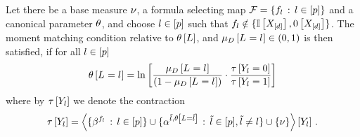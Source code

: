 \begin{lemma}
    \label{ref:lemMMinMLN}
    Let there be a base measure $\nu$, a formula selecting map $\mathcal{F}=\{f_{l} \,:\, l\in[p]\}$ and a canonical parameter $\theta$, and choose $l\in[p]$ such that $f_{l}  \notin \{\mathbb{I}\left[X_{[d]}\right],0\left[X_{[d]}\right]\}$.
    The moment matching condition relative to $\theta\left[L\right]$, and $\mu_{D}\left[L_{}=l_{}\right]\in(0,1)$ is then satisfied, if for all $l\in[p]$
    \begin{align}
        \label{sol:momentMatchingExformula}
        \theta\left[L_{}=l_{}\right] = \ln \left[ 
            \frac{\mu_{D}\left[L_{}=l_{}\right]}{(1-\mu_{D}\left[L_{}=l_{}\right])}
            \cdot \frac{\tau\left[Y_{l}=0\right]}{\tau\left[Y_{l}=1\right]}
         \right]
    \end{align}
    where by $\tau\left[Y_{l}\right]$ we denote the contraction
    \begin{align*}
        \tau\left[Y_{l}\right]
        = \left\langle \{\beta^{f_{l}} \,:\, l\in[p]\}
        \cup\{\alpha^{\tilde{l},\theta\left[L=\tilde{l}\right]} \,:\, \tilde{l} \in [p], \tilde{l}\neq l\}
        \cup\{\nu\}\right\rangle \left[ Y_{l} \right] \, .
    \end{align*}
\end{lemma}
